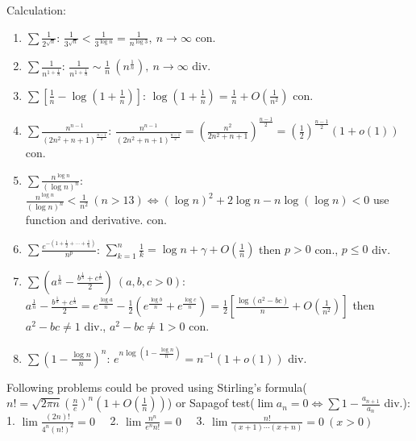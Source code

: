 \begin{prb*}
    Calculation: 
    \begin{enumerate}
        \item $\sum \frac{1}{2^{\sqrt{n}}}$: $\frac{1}{3^{\sqrt{n}}} < \frac{1}{3^{\log n}} = \frac{1}{n^{\log 3}},\ n\to\infty$ con.
        \item $\sum \frac{1}{n^{1+\frac{1}{n}}}$: $\frac{1}{n^{1+\frac{1}{n}}} \sim \frac{1}{n}\ (n^{\frac{1}{n}}),\ n\to\infty$ div.
        \item $\sum [\frac{1}{n}-\log(1+\frac{1}{n})]$: $\log(1+\frac{1}{n}) = \frac{1}{n}+O(\frac{1}{n^2})$ con.
        \item $\sum \frac{n^{n-1}}{(2n^2+n+1)^{\frac{n-1}{2}}}$: $\frac{n^{n-1}}{(2n^2+n+1)^{\frac{n-1}{2}}} = (\frac{n^2}{2n^2+n+1})^{\frac{n-1}{2}} = (\frac{1}{2})^{\frac{n-1}{2}}(1+o(1))$ con.
        \item \checkmark $\sum \frac{n^{\log n}}{(\log n)^n}$: $\frac{n^{\log n}}{(\log n)^n}<\frac{1}{n^2}\ (n>13) \iff (\log n)^2+2\log n-n\log(\log n)<0$ use function and derivative. con. 
        \item $\sum \frac{e^{-(1+\frac{1}{2}+\cdots+\frac{1}{n})}}{n^p}$: $\sum_{k=1}^{n} \frac{1}{k} = \log n + \gamma + O(\frac{1}{n})$ then $p>0$ con., $p\leq 0$ div.
        \item \checkmark $\sum (a^{\frac{1}{n}} -\frac{b^{\frac{1}{n}}+c^{\frac{1}{n}}}{2})\ (a,b,c>0)$: $a^{\frac{1}{n}} -\frac{b^{\frac{1}{n}}+c^{\frac{1}{n}}}{2} = e^{\frac{\log a}{n}} - \frac{1}{2}(e^{\frac{\log b}{n}}+e^{\frac{\log c}{n}}) = \frac{1}{2} [\frac{\log(a^2-bc)}{n}+O(\frac{1}{n^2})]$ then $a^2-bc \neq 1$ div., $a^2-bc \neq 1 > 0$ con.
        \item $\sum (1-\frac{\log n}{n})^n$: $e^{n\log(1-\frac{\log n}{n})} = n^{-1}(1+o(1))$ div.
    \end{enumerate}
\end{prb*}

\begin{prb*}
    Following problems could be proved using Stirling's formula($n! = \sqrt{2\pi n}(\frac{n}{e})^n(1+O(\frac{1}{n}))$) or Sapagof test($\lim a_n = 0 \iff \sum 1-\frac{a_{n+1}}{a_n}$ div.): \\
    1. $\lim \frac{(2n)!}{4^n(n!)^2} = 0 \quad$ 
    2. $\lim \frac{n^n}{e^n n!} = 0 \quad$ 
    3. $\lim \frac{n!}{(x+1)\cdots(x+n)}=0\ (x>0)$
\end{prb*}

